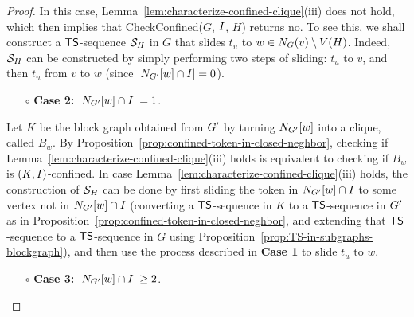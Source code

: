 \documentclass[a4paper]{llncs}
\begin{document}
\begin{proof}
\noindent
In this case, Lemma~\ref{lem:characterize-confined-clique}(iii) does not hold, which then implies that {\sc CheckConfined}($G$, $I$, $H$) returns {\sc no}.
To see this, we shall construct a ${\sf TS}$-sequence ${\cal S}_H$ in $G$ that slides $t_u$ to $w \in N_{G}(v) \setminus V(H)$.
Indeed, ${\cal S}_H$ can be constructed by simply performing two steps of sliding: $t_u$ to $v$, and then $t_u$ from $v$ to $w$ (since ${\left|N_{{G^\prime}}[w] \cap I\right|} = 0$). 
\begin{itemize}
\item [$\circ$] \textbf{Case 2:} ${\left|N_{{G^\prime}}[w] \cap I\right|}  = 1$.
\end{itemize}

\noindent
Let $K$ be the block graph obtained from ${G^\prime}$ by turning $N_{{G^\prime}}[w]$ into a clique, called $B_w$.
By Proposition~\ref{prop:confined-token-in-closed-neghbor}, checking if Lemma~\ref{lem:characterize-confined-clique}(iii) holds is equivalent to checking if $B_w$ is $(K, I)$-confined.
In case Lemma~\ref{lem:characterize-confined-clique}(iii) holds, 
	the construction of ${\cal S}_H$ can be done by 
	first sliding the token in $N_{{G^\prime}}[w] \cap I$ to some vertex not in $N_{{G^\prime}}[w] \cap I$ (converting a ${\sf TS}$-sequence in $K$ to a ${\sf TS}$-sequence in ${G^\prime}$ as in Proposition~\ref{prop:confined-token-in-closed-neghbor}, 
	and extending that ${\sf TS}$-sequence to a ${\sf TS}$-sequence in $G$ using Proposition~\ref{prop:TS-in-subgraphs-blockgraph}), 
	and then use the process described in \textbf{Case 1} to slide $t_u$ to $w$. 
\begin{itemize}
\item [$\circ$] \textbf{Case 3:} ${\left|N_{{G^\prime}}[w] \cap I\right|} \geq 2$.
\end{itemize}


\end{proof}
\end{document}
